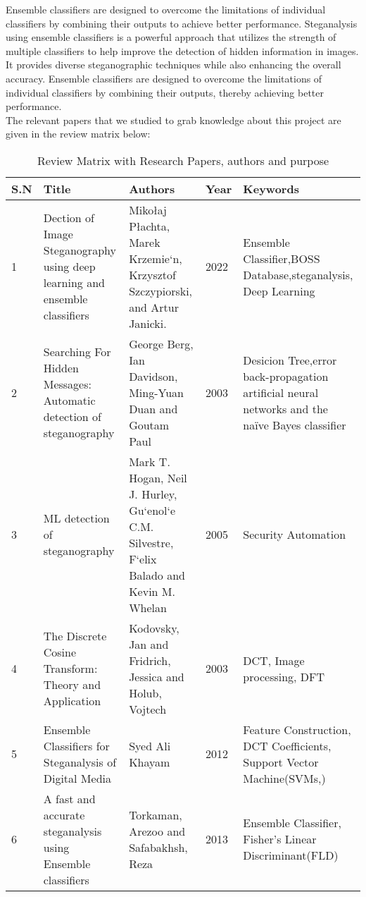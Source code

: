 Ensemble classifiers are designed to overcome the limitations of individual classifiers by combining their outputs to achieve better performance. Steganalysis using ensemble classifiers is a powerful approach that utilizes the strength of multiple classifiers to help improve the detection of hidden information in images. It provides diverse steganographic techniques while also enhancing the overall accuracy. Ensemble classifiers are designed to overcome the limitations of individual classifiers by combining their outputs, thereby achieving better performance.\\
The relevant papers that we studied to grab knowledge about this project are given in the review matrix below:
 \begin{table}[h!]
    \begin{tabular}{|p{2.5cm}|p{2.5cm}|p{2.5cm}|p{2.5cm}|p{4cm}|}
    \hline
    S.N& Title& Authors& Year & Keywords\\
    \hline
    1&Dection of Image Steganography using deep learning and ensemble classifiers&Mikołaj Płachta, Marek Krzemie`n, Krzysztof Szczypiorski, and Artur Janicki.&2022& Ensemble Classifier,BOSS Database,steganalysis, Deep Learning\\
    \hline
    2&Searching For Hidden Messages: Automatic detection of steganography&George Berg, Ian Davidson, Ming-Yuan Duan and Goutam Paul&2003& Desicion Tree,error back-propagation artificial neural networks and the naïve Bayes classifier\\
    \hline
    3&ML detection of steganography&Mark T. Hogan, Neil J. Hurley, Gu`enol`e C.M. Silvestre, F`elix Balado and Kevin M. Whelan&2005&Security Automation\\
    \hline
    4&The Discrete Cosine Transform: Theory and Application&Kodovsky, Jan and Fridrich, Jessica and Holub, Vojtech&2003&DCT, Image processing, DFT\\
    \hline
    5&Ensemble Classifiers for Steganalysis of Digital Media&Syed Ali Khayam&2012&Feature Construction, DCT Coefficients, Support Vector Machine(SVMs,)\\
    \hline
    6&A fast and accurate steganalysis using Ensemble classifiers &Torkaman, Arezoo and Safabakhsh, Reza&2013&Ensemble Classifier, Fisher's Linear Discriminant(FLD)\\
    \hline
    \end{tabular}
    \caption{Review Matrix with Research Papers, authors and purpose}
\end{table}
